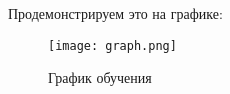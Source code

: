 Продемонстрируем это на графике:

\begin{figure}[h]
\centering
	\texttt{[image: graph.png]}
	\caption{График обучения}
	\label{sec:purpose:payings}
\end{figure}











